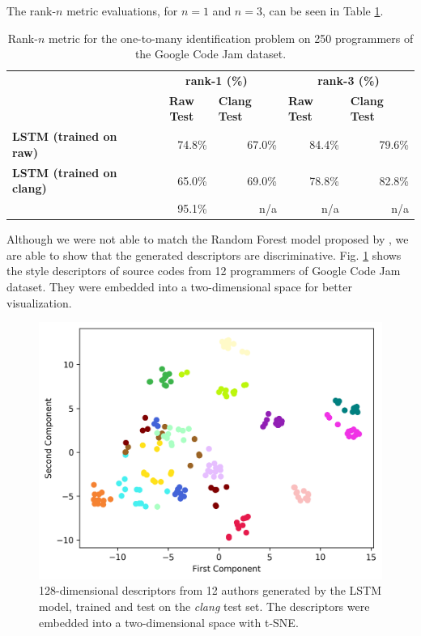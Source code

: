 The rank-$n$ metric evaluations, for $n = 1$ and $n = 3$, can be seen in Table \ref{tab:rank}.

\begin{table}[hb]
	\centering
	\begin{tabular}{lrrrr}
		\cline{2-5}
		& \multicolumn{2}{c}{\textbf{rank-1 (\%)}}                                        & \multicolumn{2}{c}{\textbf{rank-3 (\%)}}                                        \\ \cline{2-5} 
		\multicolumn{1}{c}{\textbf{}}    & \multicolumn{1}{c}{\textbf{Raw Test}} & \multicolumn{1}{l}{\textbf{Clang Test}} & \multicolumn{1}{l}{\textbf{Raw Test}} & \multicolumn{1}{l}{\textbf{Clang Test}} \\ \hline
		\textbf{LSTM (trained on raw)}   & 74.8\%                                & 67.0\%                                    & 84.4\%                                & 79.6\%                                  \\ \hline
		\textbf{LSTM (trained on clang)} & 65.0\%                                  & 69.0\%                                    & 78.8\%                                & 82.8\%                                  \\ \hline
		\textbf{\citeauthoronline{caliskan_2015}}                & 95.1\%                               & n/a                                     & n/a                                   & n/a                                     \\ \hline
	\end{tabular}
	\caption{Rank-$n$ metric for the one-to-many identification problem on 250 programmers of the Google Code Jam dataset. }
	\label{tab:rank}
\end{table}

Although we were not able to match the Random Forest model proposed by , we are able to show that the generated descriptors are discriminative. Fig. \ref{fig:embedding} shows the style descriptors of source codes from 12 programmers of Google Code Jam dataset. They were embedded into a two-dimensional space for better visualization.

\begin{figure}[ht]
	\centering
	\includegraphics[width=0.7\linewidth]{imgs/embedding.png}
	\caption{128-dimensional descriptors from 12 authors generated by the LSTM model, trained and test on the \textit{clang} test set. The descriptors were embedded into a two-dimensional space with t-SNE.}
	\label{fig:embedding}
\end{figure}